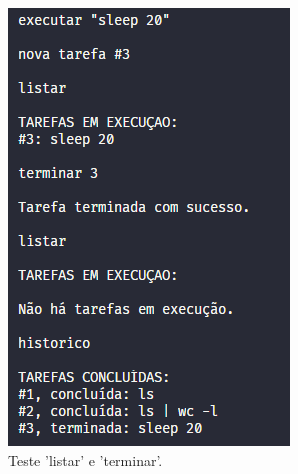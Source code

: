 \documentclass[a4paper]{report}
\begin{document}
\begin{figure}[H]
\begin{subfigure}{.3\textwidth}
			\includegraphics[width=.9\linewidth]{teste2.png}
			\caption{Teste 'listar' e 'terminar'.}
			\label{fig:test2}
		\end{subfigure}
		\begin{subfigure}{.3\textwidth}
			\centering

\end{subfigure}
\end{figure}
\end{document}
